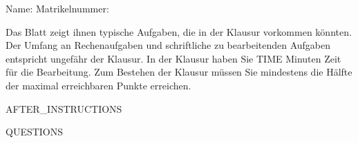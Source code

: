\documentclass[addpoints]{exam}
\begin{document}
\vspace{0.2in}
Name:\enspace\hrulefill
\hspace{0.2in}
Matrikelnummer:\enspace\hrulefill

\vspace{0.2in}

\begin{center}
    \centering
    Das Blatt zeigt ihnen typische Aufgaben, die in der Klausur vorkommen könnten. Der Umfang an
    Rechenaufgaben und schriftliche zu bearbeitenden Aufgaben entspricht ungefähr der Klausur.
    In der Klausur haben Sie {{TIME}} Minuten Zeit für die Bearbeitung.
    Zum Bestehen der Klausur müssen Sie mindestens die Hälfte der maximal erreichbaren Punkte erreichen.
\end{center}

\vspace{0.2in}

{{AFTER_INSTRUCTIONS}}

{{QUESTIONS}}
\end{document}
